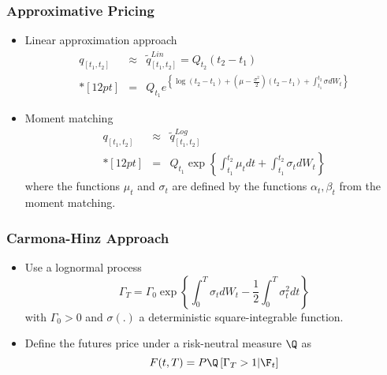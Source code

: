 {{{{{{{{{{{{{{{{{\begin{frame}
\frametitle{Approximative Pricing}
\begin{itemize}
\item<1-> Linear approximation approach
$$
\begin{array}{lll}
q_{[t_1,t_2]} &\approx& \tilde{q}^{Lin}_{[t_1,t_2]} = Q_{t_2} (t_2 - t_1) \\*[12pt]
&=&\displaystyle   Q_{t_1} e^{\left\{\log (t_2 - t_1) + \left(\mu-\frac{\sigma^2}{2}\right)(t_2-t_1)+\int_{t_1}^{t_2}\sigma dW_t\right\}}
\end{array}
$$
\item<2-> Moment matching
$$
\begin{array}{lll}
q_{[t_1,t_2]} &\approx& \tilde{q}^{Log}_{[t_1,t_2]}\\*[12pt]
&=& Q_{t_1} \exp\left\{ \int_{t_1}^{t_2}\mu_t dt + \int_{t_1}^{t_2} \sigma_t dW_t\right\}
\end{array}
$$
where the functions $\mu_t$ and $\sigma_t$ are defined by the functions $\alpha_t, \beta_t$ from the moment matching.
\end{itemize}
\end{frame}

\begin{frame}
\frametitle{Carmona-Hinz Approach}
\begin{itemize}
\item<1-> Use a lognormal process
$$
\Gamma_{T}= \Gamma_0  \exp{\left\{\int_{0}^{T}\sigma_t dW_t -\frac{1}{2}\int_0^T \sigma^2_t dt\right\}}
$$
with $\Gamma_0 >0$ and $\sigma(.)$ a deterministic square-integrable function.
\item<2-> Define the futures price under a risk-neutral measure $\Q$ as
$$
F(t,T) = P \Q\left[\Gamma_T>1 |\F_t\right]
$$
\end{itemize}
\end{frame}

}}}}}}}}}}}}}}}}}
